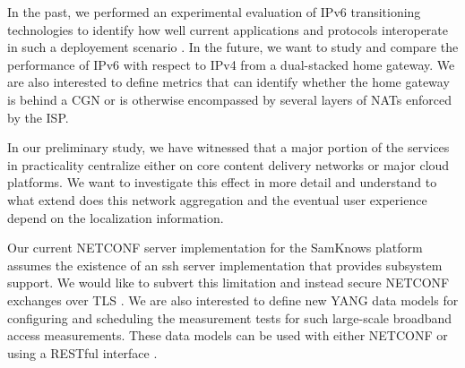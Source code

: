 In the past, we performed an experimental evaluation of IPv6 transitioning
technologies to identify how well current applications and protocols
interoperate in such a deployement scenario \cite{vbajpai:2012}. In the
future, we want to study and compare the performance of IPv6 with respect to
IPv4 from a dual-stacked home gateway.  We are also interested to define
metrics that can identify whether the home gateway is behind a \ac{CGN}  or is
otherwise encompassed by several layers of \ac{NAT}s enforced by the ISP.

In our preliminary study, we have witnessed that a major portion of the
services in practicality centralize either on core content delivery networks
or major cloud platforms. We want to investigate this effect in more detail
and understand to what extend does this network aggregation and the eventual
user experience depend on the localization information.

Our current NETCONF server implementation for the SamKnows platform assumes
the existence of an ssh server implementation that provides subsystem support.
We would like to subvert this limitation and instead secure NETCONF exchanges
over TLS \cite{draft-ietf-netconf-rfc5539bis-01}. We are also interested to
define new YANG \cite{rfc6020} data models for configuring and scheduling the
measurement tests for such large-scale broadband access measurements. These
data models can be used with either \ac{NETCONF} or using a RESTful interface
\cite{draft-bierman-netconf-yang-api-01}.
